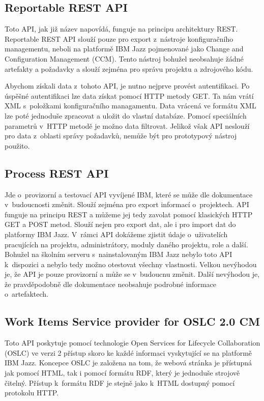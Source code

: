 \documentclass[czech,master]{diploma}
\begin{document}
\subsection{Reportable REST API}
Toto API, jak již název napovídá, funguje na principu architektury REST. Reportable REST API slouží pouze pro export z~nástroje konfiguračního managementu, neboli na platformě IBM Jazz pojmenované jako Change and Configuration Management (CCM). Tento nástroj bohužel neobsahuje žádné artefakty a požadavky a slouží zejména pro správu projektu a zdrojového kódu.

Abychom získali data z~tohoto API, je nutno nejprve provést autentifikaci. Po úspěšné autentifikaci lze data získat pomocí HTTP metody GET. Ta nám vrátí XML s~položkami konfiguračního managamentu. Data vrácená ve formátu XML lze poté jednoduše zpracovat a uložit do vlastní databáze. Pomocí speciálních parametrů v~HTTP metodě je možno data filtrovat. Jelikož však API neslouží pro data z~oblasti správy požadavků, nemůže být pro prototypový nástroj použito.

\subsection{Process REST API}
Jde o~provizorní a testovací API vyvíjené IBM, které se může dle dokumentace v~budoucnosti změnit. Slouží zejména pro export informací o~projektech. API funguje na principu REST a můžeme jej tedy  zavolat pomocí klasických HTTP GET a POST metod. Slouží nejen pro export dat, ale i pro import dat do platformy IBM Jazz. V~rámci API dokážeme zjistit údaje o~uživatelích pracujících na projektu, administrátory, moduly daného projektu, role a další. Bohužel na školním serveru s~nainstalovaným IBM Jazz nebylo toto API k~dispozici a nebylo tedy možno otestovat všechny vlastnosti. Velkou nevýhodou je, že API je pouze provizorní a může se v~budoucnu změnit. Další nevýhodou je, že pravděpodobně dle dokumentace neobsahuje podrobné informace o~artefaktech.

\subsection{Work Items Service provider for OSLC 2.0 CM}
Toto API poskytuje pomocí technologie Open Services for Lifecycle Collaboration (OSLC) ve verzi 2 přístup skoro ke každé informaci vyskytující se na platformě IBM Jazz. Koncepce OSLC je založena na tom, že webová stránka je přístupná jak pomocí HTML, tak i pomocí formátu RDF, který je jednoduše strojově čitelný. Přístup k~formátu RDF je stejně jako k~HTML dostupný pomocí protokolu HTTP.
\end{document}
